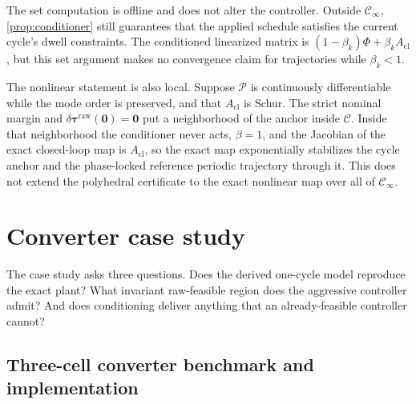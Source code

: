 \documentclass[pdflatex,iicol,sn-mathphys-ay]{sn-jnl}
\newcommand{\vect}[1]{\bm{#1}}
\newcommand{\dtau}{\delta\vect{\tau}}
\begin{document}
The set computation is offline and does not alter the controller. Outside $\mathcal C_\infty$, \cref{prop:conditioner} still guarantees that the applied schedule satisfies the current cycle's dwell constraints. The conditioned linearized matrix is $(1-\beta_k)\Phi+\beta_k A_{\mathrm{cl}}$, but this set argument makes no convergence claim for trajectories while $\beta_k<1$.

The nonlinear statement is also local. Suppose $\mathcal P$ is continuously differentiable while the mode order is preserved, and that $A_{\mathrm{cl}}$ is Schur. The strict nominal margin and $\dtau^{\mathrm{raw}}(\vect{0})=\vect{0}$ put a neighborhood of the anchor inside $\mathcal C$. Inside that neighborhood the conditioner never acts, $\beta=1$, and the Jacobian of the exact closed-loop map is $A_{\mathrm{cl}}$, so the exact map exponentially stabilizes the cycle anchor and the phase-locked reference periodic trajectory through it. This does not extend the polyhedral certificate to the exact nonlinear map over all of $\mathcal C_\infty$.

\section{Converter case study}
\label{sec:case-study}

The case study asks three questions. Does the derived one-cycle model reproduce the exact plant? What invariant raw-feasible region does the aggressive controller admit? And does conditioning deliver anything that an already-feasible controller cannot?

\subsection{Three-cell converter benchmark and implementation}
\end{document}
